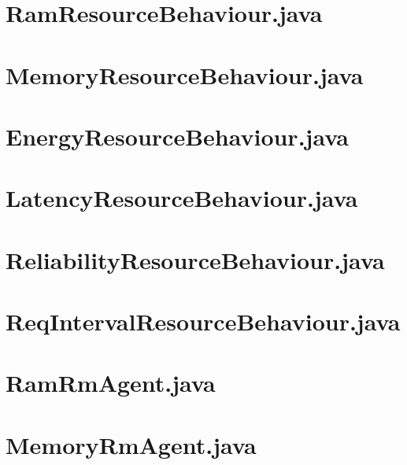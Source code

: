 \section{RamResourceBehaviour.java}


\section{MemoryResourceBehaviour.java}


\section{EnergyResourceBehaviour.java}


\section{LatencyResourceBehaviour.java}


\section{ReliabilityResourceBehaviour.java}


\section{ReqIntervalResourceBehaviour.java}


\section{RamRmAgent.java}


\section{MemoryRmAgent.java}


